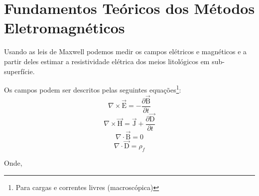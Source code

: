     
    
    \section{Fundamentos Teóricos dos Métodos Eletromagnéticos}
        Usando as leis de Maxwell \cite{eletromag8hayt} podemos medir os campos elétricos e magnéticos e a partir deles estimar a resistividade elétrica dos meios litológicos em sub-superfície.
	
        Os campos podem ser descritos pelas seguintes equações\footnote{Para cargas e correntes livres
        (macroscópica)}:
            \begin{equation}
                \label{rot_elet_max}
                \nabla \times \vec{\textrm{E}}=-\frac{\partial \vec{\textrm{B}}}{\partial t} 
            \end{equation}
            \begin{equation}
                \label{rot_mag_max}
                \nabla \times \vec{\textrm{H}} = \vec{\textrm{J}} + \frac{\partial \vec{\textrm{D}}}{\partial t}
            \end{equation}
            \begin{equation}
                \nabla \cdot \vec{\textrm{B}} = 0
            \end{equation}
            \begin{equation}
                \label{div_d}
                \nabla \cdot \vec{\textrm{D}} = \rho_f
            \end{equation}
            
            \noindent Onde,
            
